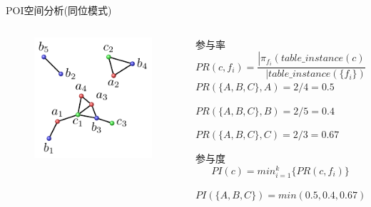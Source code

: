 \begin{frame}[c]{POI空间分析(同位模式)}
    \begin{columns}
        \begin{column}{0.3 \textwidth}
            \begin{figure}
                \centering
                \includegraphics[scale=0.8]{figures/spatialrelation.pdf}
            \end{figure}
        \end{column}

        \begin{column}{0.7 \textwidth}
            \alert{参与率}
            \begin{equation}
                PR(c,f_i)=\frac{|\pi_{f_i}(table\_instance(c))|}{|table\_instance(\{f_i\})|}
            \end{equation}
            $PR(\{A,B,C\},A)=2/4=0.5$
            
            $PR(\{A,B,C\},B)=2/5=0.4$
            
            $PR(\{A,B,C\},C)=2/3=0.67$

            \pause
            \vspace{0.5em}
            \alert{参与度}
            \begin{equation}
                PI(c)=min_{i=1}^{k}\{PR(c,f_i)\}
            \end{equation}

            $PI(\{A,B,C\})=min(0.5,0.4,0.67)=0.4$
        \end{column}
    \end{columns}
\end{frame}

